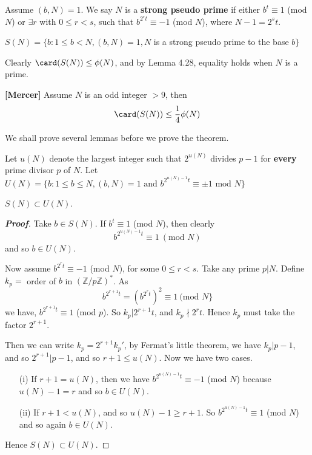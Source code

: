 \begin{definition} Assume $(b,N)=1$. We say $N$ is a {\bf strong pseudo prime}\label{S;Strong pseudo} if either $b^t \equiv 1$ (mod $N$) or $\exists r$ with $0 \le r < s$, such that $b^{2^r t} \equiv -1$ (mod $N$), where $N-1=2^s t$.
\end{definition}
\begin{definition} $S(N)=\{b: 1 \le b < N, (b,N)=1, N$  is a strong pseudo prime to the base $ b\}$
\end{definition}
Clearly $\card(S(N)) \le \phi(N)$, and by Lemma 4.28, equality holds when $N$ is a prime.
\begin{theorem}{\bf [Mercer]}\label{M;Mercer} Assume $N$ is an odd integer $>9$, then
$$\card(S(N)) \le \frac{1}{4} \phi(N)$$
\end{theorem}
We shall prove several lemmas before we prove the theorem.
\begin{definition} Let $u(N)$ denote the largest integer such that $2^{u(N)}$ divides $p-1$ for {\bf every} prime divisor $p$ of $N$. Let $U(N)=\{b: 1 \le b \le N, (b,N)=1 \text{ and } b^{2^{u(N)-1} t} \equiv \pm 1 \text{ mod } N\}$
\end{definition}
\begin{lemma} $S(N) \subset U(N)$.
\end{lemma}
\begin{proof}[\bf Proof] Take $b \in S(N)$. If $b^t \equiv 1$ (mod $N$), then clearly
$$b^{2^{u(N)-1} t} \equiv 1~(\text{mod } N) $$ and so $b \in U(N)$.

Now assume $b^{2^r t} \equiv -1$ (mod $N$), for some $0 \le r <s$. Take any prime $p|N$. Define $k_p=$ order of $b$ in $(\mathbb{Z}/p\mathbb{Z})^*$. As
$$b^{2^{r+1}t} = (b^{2^r t})^2 \equiv 1~(\text{mod } N\}$$
we have, $b^{2^{r+1}t} \equiv 1$ (mod $p$). So $k_p | 2^{r+1}t$, and $k_p \nmid 2^r t$. Hence $k_p$ must take the factor $2^{r+1}$.

Then we can write $k_p=2^{r+1}k_p'$, by Fermat's little theorem, we have $k_p |p-1$, and so
$2^{r+1} | p-1$, and so $r+1 \le u(N)$. Now we have two cases.
\begin{enumerate}
\item[(i)] If $r+1=u(N)$, then we have $b^{2^{u(N)-1}t} \equiv -1$ (mod $N$) because $u(N)-1 =r$ and so $b \in U(N)$.\\
\item[(ii)] If $r+1 < u(N)$, and so $u(N)-1 \ge r+1$. So $b^{2^{u(N)-1}t} \equiv 1$ (mod $N$) and so again $b \in U(N)$.
\end{enumerate}
Hence $S(N) \subset U(N)$.
\end{proof}
